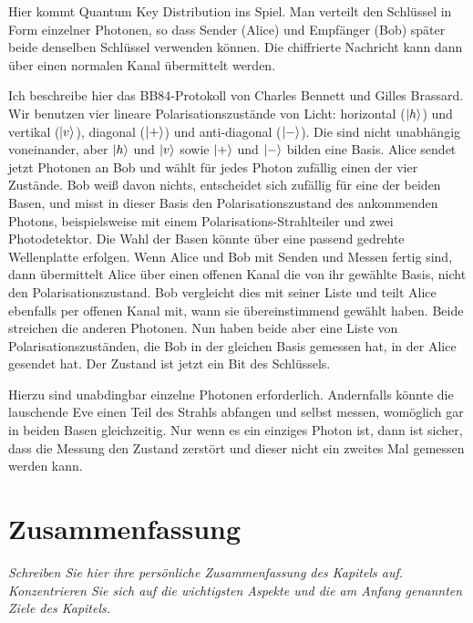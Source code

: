Hier kommt Quantum Key Distribution ins Spiel. Man verteilt den Schlüssel in Form einzelner Photonen, so dass Sender (Alice) und Empfänger (Bob) später beide denselben Schlüssel verwenden können. Die chiffrierte Nachricht kann dann über einen normalen Kanal übermittelt werden. 

Ich beschreibe hier das BB84-Protokoll von  Charles Bennett und Gilles Brassard. Wir benutzen vier lineare Polarisationszustände von Licht: horizontal ($\ket{h}$) und vertikal ($\ket{v}$), diagonal ($\ket{+}$) und anti-diagonal ($\ket{-}$). Die sind nicht unabhängig voneinander, aber $\ket{h}$  und $\ket{v}$  sowie $\ket{+}$  und $\ket{-}$ bilden eine Basis. Alice sendet jetzt Photonen an Bob und wählt für jedes Photon zufällig einen der vier Zustände. Bob weiß davon nichts, entscheidet sich zufällig für eine der beiden Basen, und misst in dieser Basis den Polarisationszustand des ankommenden Photons, beispielsweise mit einem Polarisations-Strahlteiler und zwei Photodetektor. Die Wahl der Basen könnte über eine passend gedrehte Wellenplatte erfolgen. Wenn Alice und Bob mit Senden und Messen fertig sind, dann übermittelt Alice über einen offenen Kanal die von ihr gewählte Basis, nicht den Polarisationszustand. Bob vergleicht dies mit seiner Liste und teilt Alice ebenfalls per offenen Kanal mit, wann sie übereinstimmend gewählt haben. Beide streichen die anderen Photonen. Nun haben beide aber eine Liste von Polarisationszuständen, die Bob in der gleichen Basis gemessen hat, in der Alice gesendet hat. Der Zustand ist jetzt ein Bit des Schlüssels.

Hierzu sind unabdingbar einzelne Photonen erforderlich. Andernfalls könnte die lauschende Eve einen Teil des Strahls abfangen und selbst messen, womöglich gar in beiden Basen gleichzeitig. Nur wenn es ein einziges Photon ist, dann ist sicher, dass die Messung den Zustand zerstört und dieser nicht ein zweites Mal gemessen werden kann.  



\newpage
\section{Zusammenfassung}

\textit{Schreiben Sie hier ihre persönliche Zusammenfassung des Kapitels auf. Konzentrieren Sie sich auf die wichtigsten Aspekte und die am Anfang genannten Ziele des Kapitels.}

\vspace*{9cm}
\printbibliography[segment=\therefsegment,heading=subbibliography]
